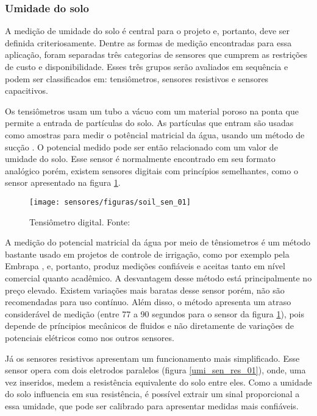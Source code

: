 		\subsubsection{Umidade do solo}
		 
		A medição de umidade do solo é central para o projeto e, portanto, deve ser definida criteriosamente. Dentre as formas de medição encontradas para essa aplicação, foram separadas três categorias de sensores que cumprem as restrições de custo e disponibilidade. Esses três grupos serão avaliados em sequência e podem ser classificados em: tensiômetros, sensores resistivos e sensores capacitivos.
	
		Os tensiômetros usam um tubo a vácuo com um material poroso na ponta que permite a entrada de partículas do solo. As partículas que entram são usadas como amostras para medir o potêncial matricial da água, usando um método de sucção \cite{bib_soil_sen_emb_01}. O potencial medido pode ser então relacionado com um valor de umidade do solo. Esse sensor é normalmente encontrado em seu formato analógico porém, existem sensores digitais com princípios semelhantes, como o sensor apresentado na figura \ref{soil_sen_01}. 
		
		\begin{figure}[H]
			\centering
			\texttt{[image: sensores/figuras/soil\_sen\_01]}
			\caption{Tensiômetro digital. Fonte: \cite{bib_soil_sen_01}}
			\label{soil_sen_01}
		\end{figure}

		A medição do potencial matricial da água por meio de tênsiometros é um método bastante usado em projetos de controle de irrigação, como por exemplo pela Embrapa \cite{bib_soil_sen_emb_02}, e, portanto, produz medições confiáveis e aceitas tanto em nível comercial quanto acadêmico. A desvantagem desse método está principalmente no preço elevado. Existem variações mais baratas desse sensor porém, não são recomendadas para uso contínuo. Além disso, o método apresenta um atraso considerável de medição (entre 77 a 90 segundos para o sensor da figura \ref{soil_sen_01}), pois depende de príncipios mecânicos de fluidos e não diretamente de variações de potenciais elétricos como nos outros sensores.
		
		Já os sensores resistivos apresentam um funcionamento mais simplificado. Esse sensor opera com dois eletrodos paralelos (figura \ref{umi_sen_res_01}), onde, uma vez inseridos, medem a resistência equivalente do solo entre eles. Como a umidade do solo influencia em sua resistência, é possível extrair um sinal proporcional a essa umidade, que pode ser calibrado para apresentar medidas mais confiáveis.
		
